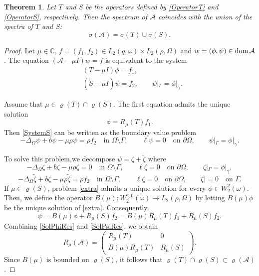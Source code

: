 \documentclass[reqno]{amsart}
\newtheorem{thm}{Theorem}
\theoremstyle{definition}
\theoremstyle{remark}
\numberwithin{equation}{section}
\newcommand{\dmn}{\mathop{\rm dom}}
\newcommand{\Comp}{\mathbb C}
\newcommand{\cA}{\mathcal{A}}
\newcommand{\rR}{R_\mu}
\begin{document}
\smallskip
\begin{thm}\label{ThmSpectrumA}
Let $T$ and $S$ be the operators defined by \eqref{OperatorT} and \eqref{OperatorS}, respectively. Then the spectrum of $\cA$ coincides with the union of the spectra of $T$ and $S$:
\begin{equation*}
\sigma(\cA)=\sigma(T)\cup\sigma(S).
\end{equation*}
\end{thm}
\smallskip

\begin{proof}
Let $\mu\in\Comp$, $f=(f_1,f_2)\in L_2(q,\omega)\times L_2(\rho,\Omega)$ and $w=(\phi,\psi)\in\dmn\cA$. 
The equation $(\cA-\mu I)w=f$ is equivalent to the system
\begin{align}\label{SystemT}
  & (T-\mu I)\phi=f_1,\\\label{SystemS}
  & (\mathring{S}-\mu I)\psi=f_2,\qquad \psi|_\Gamma=\phi|_\gamma.
\end{align}


Assume that $\mu\in \varrho(T)\cap \varrho(S)$. The first equation admits the unique solution
\begin{equation}\label{SolPhiRes} 
  \phi=\rR(T)f_1.
\end{equation}
Then  \eqref{SystemS}  can be written as the boundary value problem
\begin{equation*}
-\Delta_\Omega \psi+b\psi-\mu\rho \psi=\rho f_2 \quad\text{in }\Omega\setminus\Gamma, \qquad
\ell \psi=0 \quad\text{on }\partial\Omega, \qquad \psi|_\Gamma=\phi|_\gamma.
\end{equation*}

To solve this problem,we decompose $\psi=\zeta+\tilde\zeta$ where 
\begin{equation}\label{extra}
-\Delta_\Omega \zeta+b\zeta-\mu\rho \zeta=0 \quad\text{in }\Omega\setminus\Gamma, \qquad
\ell \zeta=0 \quad\text{on }\partial\Omega, \qquad \zeta|_\Gamma=\phi|_\gamma,
\end{equation}
\begin{equation*}
-\Delta_\Omega \tilde\zeta+b\zeta-\mu\rho \tilde\zeta=\rho f_2 \quad\text{in }\Omega\setminus\Gamma, \qquad
\ell \zeta=0 \quad\text{on }\partial\Omega, \qquad \zeta|=0 \quad\text{on }\Gamma.
\end{equation*}
If $\mu\in\varrho(S)$, problem \eqref{extra} admits a unique solution for every $\phi\in W_2^2(\omega)$. Then, we
define the operator $B(\mu)\colon W_2^{2,0}(\omega)\to L_2
(\rho,\Omega)$ by letting $B(\mu)\phi$ be the unique solution of 
\eqref{extra}. 
Consequently,
\begin{equation}\label{SolPsiRes}
\psi=B(\mu)\phi+\rR(S)f_2=B(\mu)\rR(T)f_1+\rR(S)f_2.
\end{equation}
Combining \eqref{SolPhiRes} and \eqref{SolPsiRes}, we obtain
\begin{equation*}
    \rR(\cA)=
    \begin{pmatrix}
        \rR(T) &0  \\
    B(\mu)\rR(T)  & \rR(S)
    \end{pmatrix}.
\end{equation*}
Since $B(\mu)$ is bounded on $\varrho(S)$, it follows that $\varrho(T)\cap\varrho(S)\subset\varrho(\cA)$.



\end{proof}
\end{document}
